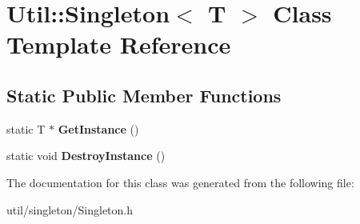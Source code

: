 \hypertarget{class_util_1_1_singleton}{}\section{Util\+:\+:Singleton$<$ T $>$ Class Template Reference}
\label{class_util_1_1_singleton}
\subsection*{Static Public Member Functions}
\begin{DoxyCompactItemize}
\item 
\mbox{\label{class_util_1_1_singleton_a1e2fe8ce46d83833b2c7eb3d918ae4fb}} 
static T $\ast$ {\bfseries Get\+Instance} ()
\item 
\mbox{\label{class_util_1_1_singleton_a227b4fff4d5948838a519c66c1a480f5}} 
static void {\bfseries Destroy\+Instance} ()
\end{DoxyCompactItemize}


The documentation for this class was generated from the following file\+:\begin{DoxyCompactItemize}
\item 
util/singleton/Singleton.\+h\end{DoxyCompactItemize}
